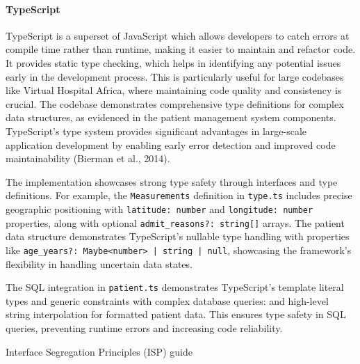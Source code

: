 \paragraph{TypeScript}\mbox{}

TypeScript is a superset of JavaScript which allows developers to catch errors at compile time rather than runtime, making it easier to maintain and refactor code. It provides static type checking, which helps in identifying any potential issues early in the development process. This is particularly useful for large codebases like Virtual Hospital Africa, where maintaining code quality and consistency is crucial. The codebase demonstrates comprehensive type definitions for complex data structures, as evidenced in the patient management system components. TypeScript's type system provides significant advantages in large-scale application development by enabling early error detection and improved code maintainability (Bierman et al., 2014).

The implementation showcases strong type safety through interfaces and type definitions. For example, the \texttt{Measurements} definition in \texttt{type.ts} includes precise geographic positioning with \texttt{latitude: number} and \texttt{longitude: number} properties, along with optional \texttt{admit\_reasons?: string[]} arrays. The patient data structure demonstrates TypeScript's nullable type handling with properties like \texttt{age\_years?: Maybe<number> | string | null}, showcasing the framework's flexibility in handling uncertain data states.

The SQL integration in \texttt{patient.ts} demonstrates TypeScript's template literal types and generic constraints with complex database queries: \texttt{} and high-level string interpolation for formatted patient data. This ensures type safety in SQL queries, preventing runtime errors and increasing code reliability.

Interface Segregation Principles (ISP) guide 